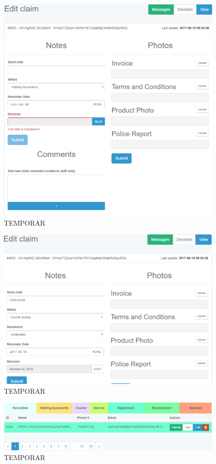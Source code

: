 	\begin{figure}
		\includegraphics[width=\linewidth]{../imagini/claims_edit.png}
		\caption{TEMPORAR}
		\label{fig:TEMP}
	\end{figure}
	\begin{figure}
		\includegraphics[width=\linewidth]{../imagini/claims_edit_with_decision.png}
		\caption{TEMPORAR}
		\label{fig:TEMP}
	\end{figure}
	\begin{figure}
		\includegraphics[width=\linewidth]{../imagini/claims_filtered.png}
		\caption{TEMPORAR}
		\label{fig:TEMP}
	\end{figure}
